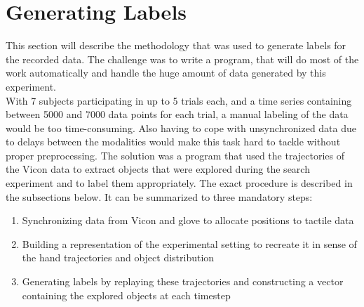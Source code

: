 \section{Generating Labels}
This section will describe the methodology that was used to generate labels for the recorded data. The challenge was to write a program, that will do most of the work automatically and handle the huge amount of data generated by this experiment.\\
With 7 subjects participating in up to 5 trials each, and a time series containing between 5000 and 7000 data points for each trial, a manual labeling of the data would be too time-consuming. Also having to cope with unsynchronized data due to delays between the modalities would make this task hard to tackle without proper preprocessing. The solution was a program that used the trajectories of the Vicon data to extract objects that were explored during the search experiment and to label them appropriately. The exact procedure is described in the subsections below. It can be summarized to three mandatory steps:
\begin{enumerate}
	\item Synchronizing data from Vicon and glove to allocate positions to tactile data
	\item Building a representation of the experimental setting to recreate it in sense of the hand trajectories and object distribution
	\item Generating labels by replaying these trajectories and constructing a vector containing the explored objects at each timestep
\end{enumerate}

